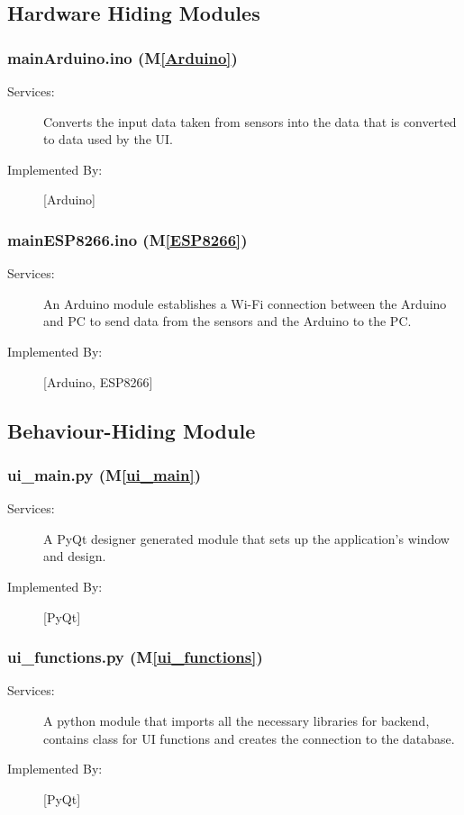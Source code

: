 \documentclass[12pt, titlepage]{article}
\newcommand{\mref}[1]{M\ref{#1}}
\begin{document}
\subsection{Hardware Hiding Modules}

\subsubsection{mainArduino.ino (\mref{Arduino})}
\begin{description}
\item[Services:]Converts the input data taken from sensors into the data that is converted to data used by the UI.
\item[Implemented By:] [Arduino]
\end{description}

\subsubsection{mainESP8266.ino (\mref{ESP8266})}
\begin{description}
\item[Services:] An Arduino module establishes a Wi-Fi connection between the Arduino and PC to send data from the sensors and the Arduino to the PC.
\item[Implemented By:] [Arduino, ESP8266]
\end{description}

\subsection{Behaviour-Hiding Module}

\subsubsection{ui\_main.py (\mref{ui_main})}

\begin{description}
\item[Services:] A PyQt designer generated module that sets up the application's window and design.
\item[Implemented By:] [PyQt]
\end{description}

\subsubsection{ui\_functions.py (\mref{ui_functions})}
\begin{description}
\item[Services:] A python module that imports all the necessary libraries for backend, contains class for UI functions and creates the connection to the database.
\item[Implemented By:] [PyQt]
\end{description}
\end{document}

